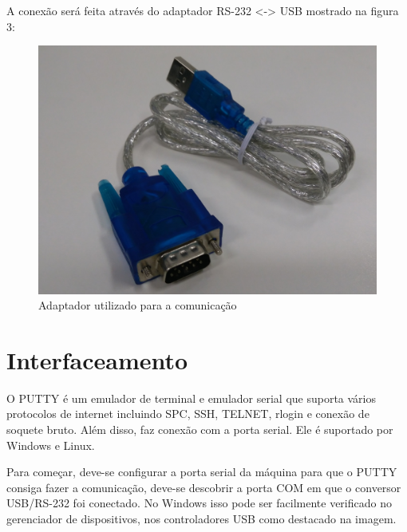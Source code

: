 \documentclass[12pt,a4paper]{article} %
\begin{document}
A conexão será feita através do adaptador RS-232 <-> USB mostrado na 
figura 3:

\begin{figure}[!htb]
\centering
	\includegraphics[scale=0.06]{imagens/adaptador.jpg}
	\caption{Adaptador utilizado para a comunicação}
	\label{Adaptador}
\end{figure}

\section{Interfaceamento}
O PUTTY é um emulador de terminal e emulador serial que suporta vários 
protocolos de internet incluindo SPC, SSH, TELNET, rlogin e conexão de 
soquete bruto. Além disso, faz conexão com a porta serial. Ele é 
suportado por Windows e Linux.

Para começar, deve-se configurar a porta serial da máquina para que o 
PUTTY consiga fazer a comunicação, deve-se descobrir a porta COM em que 
o conversor USB/RS-232 foi conectado. No Windows isso pode ser 
facilmente verificado no gerenciador de dispositivos, nos controladores 
USB como destacado na imagem.
\end{document}
